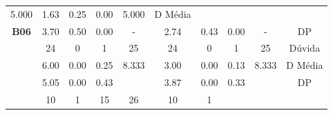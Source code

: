 \begin{table}[htbp]
\begin{tabular}{|cccccccccc}
		\multicolumn{1}{c|}{\cellcolor[HTML]{D9D9D9}5.000} &
		\multicolumn{1}{c|}{\cellcolor[HTML]{D9D9D9}1.63} &
		\multicolumn{1}{c|}{\cellcolor[HTML]{D9D9D9}0.25} &
		\multicolumn{1}{c|}{\cellcolor[HTML]{D9D9D9}0.00} &
		\multicolumn{1}{c|}{\cellcolor[HTML]{D9D9D9}5.000} &
		\multicolumn{1}{c|}{\cellcolor[HTML]{D9D9D9}D Média} \\ \cline{2-10} 
		\multicolumn{1}{|c|}{\multirow{-3}{*}{\cellcolor[HTML]{F2F2F2}\textbf{B06}}} &
		\multicolumn{1}{c|}{3.70} &
		\multicolumn{1}{c|}{0.50} &
		\multicolumn{1}{c|}{0.00} &
		\multicolumn{1}{c|}{-} &
		\multicolumn{1}{c|}{2.74} &
		\multicolumn{1}{c|}{0.43} &
		\multicolumn{1}{c|}{0.00} &
		\multicolumn{1}{c|}{-} &
		\multicolumn{1}{c|}{DP} \\ \hline
		\rowcolor[HTML]{D9D9D9} 
		\multicolumn{1}{|c|}{\cellcolor[HTML]{F2F2F2}} &
		\multicolumn{1}{c|}{\cellcolor[HTML]{D9D9D9}24} &
		\multicolumn{1}{c|}{\cellcolor[HTML]{D9D9D9}0} &
		\multicolumn{1}{c|}{\cellcolor[HTML]{D9D9D9}1} &
		\multicolumn{1}{c|}{\cellcolor[HTML]{D9D9D9}25} &
		\multicolumn{1}{c|}{\cellcolor[HTML]{D9D9D9}24} &
		\multicolumn{1}{c|}{\cellcolor[HTML]{D9D9D9}0} &
		\multicolumn{1}{c|}{\cellcolor[HTML]{D9D9D9}1} &
		\multicolumn{1}{c|}{\cellcolor[HTML]{D9D9D9}25} &
		\multicolumn{1}{c|}{\cellcolor[HTML]{D9D9D9}Dúvida} \\ \cline{2-10} 
		\multicolumn{1}{|c|}{\cellcolor[HTML]{F2F2F2}} &
		\multicolumn{1}{c|}{6.00} &
		\multicolumn{1}{c|}{0.00} &
		\multicolumn{1}{c|}{0.25} &
		\multicolumn{1}{c|}{8.333} &
		\multicolumn{1}{c|}{3.00} &
		\multicolumn{1}{c|}{0.00} &
		\multicolumn{1}{c|}{0.13} &
		\multicolumn{1}{c|}{8.333} &
		\multicolumn{1}{c|}{D Média} \\ \cline{2-10} 
		\rowcolor[HTML]{D9D9D9} 
		\multicolumn{1}{|c|}{\multirow{-3}{*}{\cellcolor[HTML]{F2F2F2}\textbf{B08}}} &
		\multicolumn{1}{c|}{\cellcolor[HTML]{D9D9D9}5.05} &
		\multicolumn{1}{c|}{\cellcolor[HTML]{D9D9D9}0.00} &
		\multicolumn{1}{c|}{\cellcolor[HTML]{D9D9D9}0.43} &
		\multicolumn{1}{c|}{\cellcolor[HTML]{D9D9D9}} &
		\multicolumn{1}{c|}{\cellcolor[HTML]{D9D9D9}3.87} &
		\multicolumn{1}{c|}{\cellcolor[HTML]{D9D9D9}0.00} &
		\multicolumn{1}{c|}{\cellcolor[HTML]{D9D9D9}0.33} &
		\multicolumn{1}{c|}{\cellcolor[HTML]{D9D9D9}} &
		\multicolumn{1}{c|}{\cellcolor[HTML]{D9D9D9}DP} \\ \hline
		\multicolumn{1}{|c|}{\cellcolor[HTML]{F2F2F2}} &
		\multicolumn{1}{c|}{10} &
		\multicolumn{1}{c|}{1} &
		\multicolumn{1}{c|}{15} &
		\multicolumn{1}{c|}{26} &
		\multicolumn{1}{c|}{10} &
		\multicolumn{1}{c|}{1} &

\end{tabular}
\end{table}
